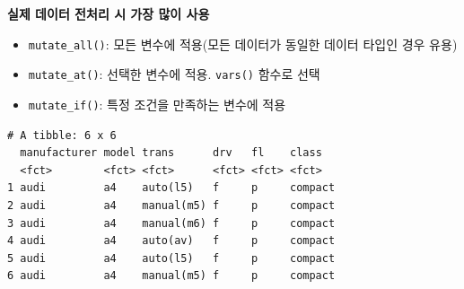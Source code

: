 \documentclass[
  11pt,
]{krantz}
\makeatletter
\newenvironment{Shaded}{\begin{snugshade}}{\end{snugshade}}
\newcommand{\CommentTok}[1]{\textcolor[rgb]{0.37,0.37,0.37}{\textit{#1}}}
\newcommand{\KeywordTok}[1]{\textcolor[rgb]{0.27,0.27,0.27}{\textbf{#1}}}
\newcommand{\NormalTok}[1]{#1}
\newcommand{\OperatorTok}[1]{\textcolor[rgb]{0.43,0.43,0.43}{\textbf{#1}}}
\newcommand{\StringTok}[1]{\textcolor[rgb]{0.5,0.5,0.5}{#1}}
\providecommand{\tightlist}{%
  \setlength{\itemsep}{0pt}\setlength{\parskip}{0pt}}
\newenvironment{kframe}{%
\medskip{}
\setlength{\fboxsep}{.8em}
 \def\at@end@of@kframe{}%
 \ifinner\ifhmode%
  \def\at@end@of@kframe{\end{minipage}}%
  \begin{minipage}{\columnwidth}%
 \fi\fi%
 \def\FrameCommand##1{\hskip\@totalleftmargin \hskip-\fboxsep
 \colorbox{shadecolor}{##1}\hskip-\fboxsep
     \hskip-\linewidth \hskip-\@totalleftmargin \hskip\columnwidth}%
 \MakeFramed {\advance\hsize-\width
   \@totalleftmargin\z@ \linewidth\hsize
   \@setminipage}}%
 {\par\unskip\endMakeFramed%
 \at@end@of@kframe}
\renewenvironment{quote}{\begin{kframe}}{\end{kframe}}
\makeatother
\begin{document}
\begin{quote}
\textbf{실제 데이터 전처리 시 가장 많이 사용}

\begin{itemize}
\tightlist
\item
  \texttt{mutate\_all()}: 모든 변수에 적용(모든 데이터가 동일한 데이터 타입인 경우 유용)
\item
  \texttt{mutate\_at()}: 선택한 변수에 적용. \texttt{vars()} 함수로 선택
\item
  \texttt{mutate\_if()}: 특정 조건을 만족하는 변수에 적용
\end{itemize}
\end{quote}

\footnotesize

\begin{Shaded}
\end{Shaded}

\begin{verbatim}
# A tibble: 6 x 6
  manufacturer model trans      drv   fl    class  
  <fct>        <fct> <fct>      <fct> <fct> <fct>  
1 audi         a4    auto(l5)   f     p     compact
2 audi         a4    manual(m5) f     p     compact
3 audi         a4    manual(m6) f     p     compact
4 audi         a4    auto(av)   f     p     compact
5 audi         a4    auto(l5)   f     p     compact
6 audi         a4    manual(m5) f     p     compact
\end{verbatim}

\begin{Shaded}
\end{Shaded}
\end{document}
